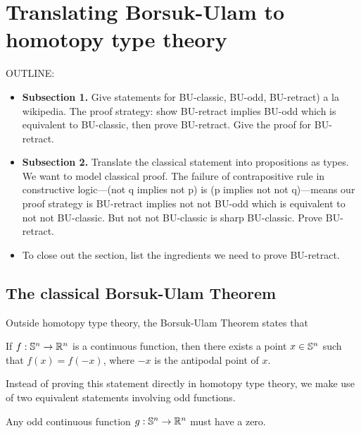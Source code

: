 \documentclass{amsart}
\begin{document}
\section{Translating Borsuk-Ulam to homotopy type theory}
\label{sec:bu-to-hott}

OUTLINE:
\begin{itemize}
\item
  \textbf{Subsection 1.} Give statements for BU-classic,
  BU-odd, BU-retract) a la wikipedia. The proof strategy:
  show BU-retract implies BU-odd which is equivalent to
  BU-classic, then prove BU-retract. Give the proof for
  BU-retract.
\item
  \textbf{Subsection 2.} Translate the classical statement
  into propositions as types. We want to model classical proof.
  The failure of contrapositive rule in constructive
  logic---(not q implies not p) is (p implies not not
  q)---means our proof strategy is BU-retract implies not
  not BU-odd which is equivalent to not not BU-classic. But
  not not BU-classic is sharp BU-classic. Prove BU-retract. 
\item
  To close out the section, list the ingredients we need to
  prove BU-retract.
\end{itemize}

\subsection{The classical Borsuk-Ulam Theorem}

Outside homotopy type theory, the Borsuk-Ulam Theorem states that 

\begin{statement}\label{BUClassic}
  If $f: \mathbb{S}^n \rightarrow \mathbb{R}^n$ is a continuous function, then there
  exists a point $x \in \mathbb{S}^n$ such that $f(x) = f(-x)$, where $-x$ is
  the antipodal point of $x$.
\end{statement}

Instead of proving this statement directly in homotopy type theory, we make use of two equivalent statements involving odd functions.

\begin{statement}\label{BUOdd}
  Any odd continuous function $g: \mathbb{S}^n \rightarrow \mathbb{R}^n$ must have a
  zero.
\end{statement}
\end{document}
